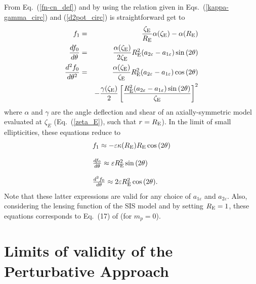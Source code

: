 \documentclass[useAMS,usenatbib]{mn2e}
\begin{document}
From Eq.~(\ref{fn-cn_def}) and by using the relation given in Eqs.~(\ref{kappa-gamma_circ}) and (\ref{d2pot_circ}) is straightforward get to
\begin{eqnarray}
f_1 &= &\frac{\zeta_{\rm E}}{R_{\rm E}}\alpha(\zeta_{\rm E})-\alpha(R_{\rm E}) \nonumber \\
\frac{d f_0}{d\theta}&=& \frac{\alpha(\zeta_{\rm E})}{2\zeta_{\rm E}} R^2_{\rm E}(a_{2\varepsilon}-a_{1\varepsilon})\sin{(2\theta)} \label{dfn_pe}\\
\frac{d^2 f_0}{d\theta^2}&=& \frac{\alpha(\zeta_{\rm E})}{\zeta_{\rm E}} R^2_{\rm E}(a_{2\varepsilon}-a_{1\varepsilon})\cos{(2\theta)} \nonumber \\
& & - \frac{\gamma(\zeta_{\rm E})}{2}\left[ \frac{ R^2_{\rm E}(a_{2\varepsilon}-a_{1\varepsilon})\sin{(2\theta)}}{\zeta_{\rm E}}\right]^2 \nonumber
\end{eqnarray}
where $\alpha$ and $\gamma$ are the angle deflection and shear of an axially-symmetric model evaluated at $\zeta_E$ (Eq.~(\ref{zeta_E}), such that $r=R_{\rm E}$). In the limit of small ellipticities, these equations reduce to
\begin{equation}\label{fn_pe_small}
\begin{array}{l}
f_1 \approx  -\varepsilon \kappa(R_{\rm E})R_{\rm E}\cos{(2\theta)}\\
\\
\frac{df_0}{d\theta}\approx\varepsilon R^2_{\rm E}\sin{(2\theta)}\\
\\
\frac{d^2f_0}{d\theta}\approx 2\varepsilon R^2_{\rm E}\cos{(2\theta)}.
\end{array}
\end{equation}
Note that these latter expressions are valid for any choice of $a_{1\varepsilon}$ and $a_{2\varepsilon}$. Also, considering the lensing function of the SIS model and by setting $R_{\rm E}=1$, these equations corresponds to Eq.~(17) of \citet{allard08} (for $m_p=0$).

\section{Limits of validity of the Perturbative Approach}
\end{document}
